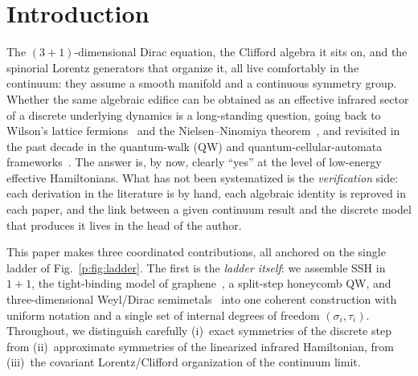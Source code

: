 \section{Introduction}
\label{p:intro}

The $(3{+}1)$-dimensional Dirac equation, the Clifford algebra it sits on,
and the spinorial Lorentz generators that organize it, all live
comfortably in the continuum: they assume a smooth manifold and a
continuous symmetry group. Whether the same algebraic edifice can be
obtained as an effective infrared sector of a discrete underlying
dynamics is a long-standing question, going back to Wilson's lattice
fermions~\cite{Wilson1974} and the Nielsen--Ninomiya
theorem~\cite{NielsenNinomiya1981a,NielsenNinomiya1981b}, and revisited
in the past decade in the quantum-walk (QW) and quantum-cellular-automata
frameworks~\cite{Arrighi2018,Farrelly2020,FarrellyShort2014,BisioDAriano2015}.
The answer is, by now, clearly \enquote{yes} at the level of low-energy
effective Hamiltonians. What has not been systematized is the
\emph{verification} side: each derivation in the literature is by hand,
each algebraic identity is reproved in each paper, and the link between
a given continuum result and the discrete model that produces it lives
in the head of the author.



This paper makes three coordinated contributions, all anchored on the
single ladder of Fig.~\ref{p:fig:ladder}. The first is the
\emph{ladder itself}: we assemble SSH in $1{+}1$, the tight-binding
model of graphene~\cite{SuSchriefferHeeger1979,Semenoff1984,CastroNeto2009},
a split-step honeycomb QW, and three-dimensional Weyl/Dirac
semimetals~\cite{Burkov2018} into one coherent
construction with uniform notation and a single set of internal degrees
of freedom $(\sigma_{i},\tau_{i})$. Throughout, we distinguish carefully
(i)~exact symmetries of the discrete step from (ii)~approximate
symmetries of the linearized infrared Hamiltonian, from (iii)~the
covariant Lorentz/Clifford organization of the continuum limit.

